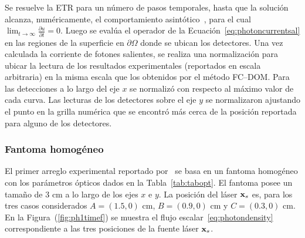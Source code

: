 Se resuelve la ETR para un número de pasos temporales, 
hasta que la solución alcanza, numéricamente, el comportamiento 
asintótico~\cite{Bruno2010}, para el cual $\lim_{t\to \infty} \frac{\partial u}{\partial t}=0$. 
Luego se evalúa el operador de la Ecuación~\eqref{eq:photoncurrentsal} 
en las regiones de la superficie en $\partial \Omega$ 
donde se ubican los detectores.
Una vez  calculada la corriente de fotones salientes, se
realiza una normalización para ubicar la lectura 
de los resultados experimentales (reportados en escala arbitraria) 
en la misma escala que los obtenidos por el método FC--DOM. 
Para las detecciones a lo largo del eje $x$ se normalizó 
con respecto al máximo valor de cada curva. 
 Las lecturas de los detectores sobre el eje $y$ 
 se normalizaron ajustando el punto en la grilla numérica 
 que se encontró más cerca de la posición reportada 
 para alguno de los detectores. 
 
\subsubsection{Fantoma homogéneo}

El primer arreglo experimental reportado por~\cite{Klose2002} 
se basa en un fantoma homogéneo con los parámetros ópticos 
dados en la Tabla~\ref{tab:tabopt}. El fantoma posee un tamaño  
de $3$ cm a lo largo de los ejes $x$ e $y$. La posición del láser 
   $\mathbf{x}_s$ es, para los tres casos considerados $A=(1.5,0)$ cm, $B=(0.9,0)$ cm
    y $C=(0.3,0)$ cm. En la Figura~(\ref{fig:ph1timef}) se muestra 
el flujo escalar~\eqref{eq:photondensity} 
correspondiente a las tres posiciones de la fuente láser $\mathbf{x}_s$. 

